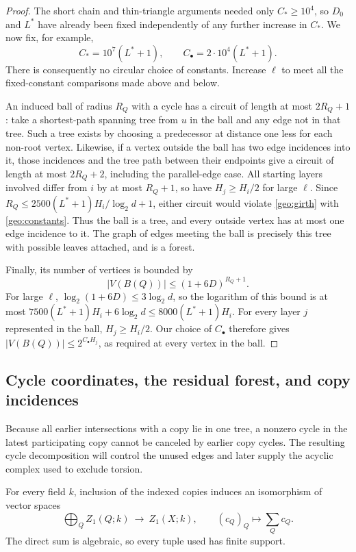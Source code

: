 \begin{proof}
The short chain and thin-triangle arguments needed only $C_*\ge10^4$,
so $D_0$ and $L^*$ have already been fixed independently of any further
increase in $C_*$.  We now fix, for example,
\begin{equation}
 C_*=10^7(L^*+1),\qquad C_\bullet=2\cdot10^4(L^*+1).
 \label{geo:constants}
\end{equation}
There is consequently no circular choice of constants.  Increase $\ell$
to meet all the fixed-constant comparisons made above and below.

An induced ball of radius $R_Q$ with a cycle has a circuit of length at
most $2R_Q+1$: take a shortest-path spanning tree from $u$ in the ball
and any edge not in that tree.  Such a tree exists by choosing a predecessor
at distance one less for each non-root vertex.  Likewise, if a vertex
outside the ball has two edge incidences into it, those incidences and
the tree path between their endpoints give a circuit of length at most
$2R_Q+2$, including the parallel-edge case.  All starting layers involved
differ from $i$ by at most $R_Q+1$, so have $H_j\ge H_i/2$ for large
$\ell$.  Since
$R_Q\le2500(L^*+1)H_i/\log_2d+1$, either circuit would violate
\eqref{geo:girth} with \eqref{geo:constants}.  Thus the ball is a tree,
and every outside vertex has at most one edge incidence to it.  The graph
of edges meeting the ball is precisely this tree with possible leaves
attached, and is a forest.

Finally, its number of vertices is bounded by
\[
 |V(B(Q))|\le(1+6D)^{R_Q+1}.
\]
For large $\ell$, $\log_2(1+6D)\le3\log_2d$, so the logarithm of this
bound is at most
$7500(L^*+1)H_i+6\log_2d\le8000(L^*+1)H_i$.
For every layer $j$ represented in the ball,
$H_j\ge H_i/2$.  Our choice of $C_\bullet$ therefore gives
$|V(B(Q))|\le2^{C_\bullet H_j}$, as required at every vertex in the ball.
\end{proof}

\subsection{Cycle coordinates, the residual forest, and copy incidences}
\label{geo:cycles}

Because all earlier intersections with a copy lie in one tree, a nonzero
cycle in the latest participating copy cannot be canceled by earlier copy
cycles.  The resulting cycle decomposition will control the unused edges
and later supply the
acyclic complex used to exclude torsion.

\begin{proposition}
\label{geo:cycle-directness}
For every field $k$, inclusion of the indexed copies induces an isomorphism
of vector spaces
\begin{equation}
 \bigoplus_Q Z_1(Q;k)\ \longrightarrow\ Z_1(X;k),
 \qquad (c_Q)_Q\longmapsto\sum_Q c_Q.
 \label{geo:cycle-decomposition}
\end{equation}
The direct sum is algebraic, so every tuple used has finite support.
\end{proposition}


